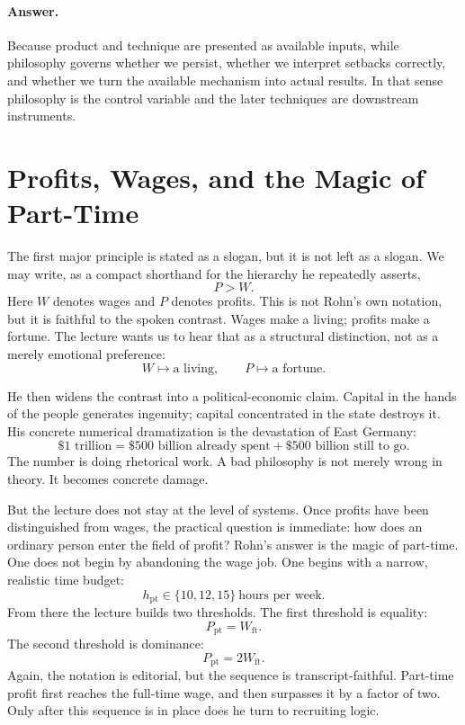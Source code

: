 \paragraph{Answer.} Because product and technique are presented as available inputs, while philosophy governs whether we persist, whether we interpret setbacks correctly, and whether we turn the available mechanism into actual results. In that sense philosophy is the control variable and the later techniques are downstream instruments.

\section{Profits, Wages, and the Magic of Part-Time}

The first major principle is stated as a slogan, but it is not left as a slogan. We may write, as a compact shorthand for the hierarchy he repeatedly asserts,
\begin{equation}
P > W.
\end{equation}
Here \(W\) denotes wages and \(P\) denotes profits. This is not Rohn's own notation, but it is faithful to the spoken contrast. Wages make a living; profits make a fortune. The lecture wants us to hear that as a structural distinction, not as a merely emotional preference:
\begin{equation}
W \longmapsto \text{a living},
\qquad
P \longmapsto \text{a fortune}.
\end{equation}

He then widens the contrast into a political-economic claim. Capital in the hands of the people generates ingenuity; capital concentrated in the state destroys it. His concrete numerical dramatization is the devastation of East Germany:
\begin{equation}
\$1\text{ trillion}
=
\$500\text{ billion already spent}
+
\$500\text{ billion still to go}.
\end{equation}
The number is doing rhetorical work. A bad philosophy is not merely wrong in theory. It becomes concrete damage.

But the lecture does not stay at the level of systems. Once profits have been distinguished from wages, the practical question is immediate: how does an ordinary person enter the field of profit? Rohn's answer is the magic of part-time. One does not begin by abandoning the wage job. One begins with a narrow, realistic time budget:
\begin{equation}
h_{\mathrm{pt}} \in \{10,12,15\}\ \text{hours per week}.
\end{equation}
From there the lecture builds two thresholds. The first threshold is equality:
\begin{equation}
P_{\mathrm{pt}} = W_{\mathrm{ft}}.
\end{equation}
The second threshold is dominance:
\begin{equation}
P_{\mathrm{pt}} = 2W_{\mathrm{ft}}.
\end{equation}
Again, the notation is editorial, but the sequence is transcript-faithful. Part-time profit first reaches the full-time wage, and then surpasses it by a factor of two. Only after this sequence is in place does he turn to recruiting logic.

